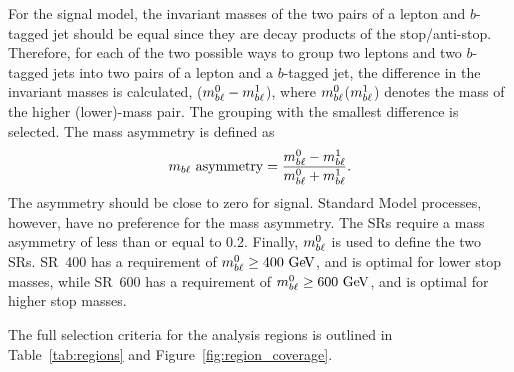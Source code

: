 For the signal model, the invariant masses of the two pairs of a lepton and
$b$-tagged jet should be equal since they are decay products of the
stop/anti-stop. Therefore, for each of the two possible ways to group
two leptons and two $b$-tagged jets into two pairs of a lepton and a
$b$-tagged jet, the difference in the invariant masses is calculated,
($m_{b\ell}^0-m_{b\ell}^1$), where $m_{b\ell}^0$($m_{b\ell}^1$) denotes the mass of the
higher (lower)-mass pair. The grouping with the smallest difference
is selected.  The mass asymmetry is defined as
\begin{equation}
  m_{b\ell}~\mathrm{asymmetry} = 
  \frac{m_{b\ell}^0-m_{b\ell}^1}{m_{b\ell}^0+m_{b\ell}^1}.
\end{equation}
The asymmetry should be
close to zero for signal.  Standard Model processes, however, have no
preference for the mass asymmetry.  The SRs require a mass
asymmetry of less than or equal to 0.2.
Finally, $m_{b\ell}^0$ is used to define the two SRs.
SR~400 has a requirement of $\MBL^0 \geq 400 \GeV$, and is optimal for lower
stop masses, while SR~600 has a requirement of $\MBL^0 \geq 600 \GeV$, and is
optimal for higher stop masses.

The full selection criteria for the analysis regions is outlined in
Table~\ref{tab:regions} and Figure~\ref{fig:region_coverage}.

\begin{table}[ht]
  \caption{Summary of signal, control, and validation regions used for this
    analysis.
    The control and validation regions are explained in Section~\ref{sec:bkg}.
    All regions require two $b$-tagged jets and two oppositely charged
    leptons. An event is in the $Z$ window if it contains two same-flavored
    leptons with an invariant mass within 10~\GeV of the mass of the $Z$ boson.
  }
  \label{tab:regions}
\end{table}

